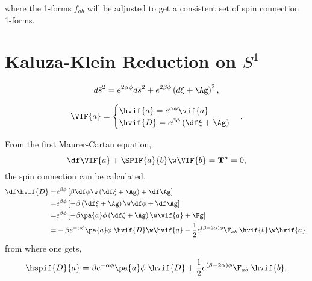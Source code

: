 where the 1-forms $f_{ab}$ will be adjusted to get a consistent set of spin connection 1-forms.






\chapter{Kaluza-Klein Reduction on $S^1$}


\begin{equation}
  d\hat{s}^2 = e^{2\alpha\phi}ds^2 + e^{2\beta\phi}\left(d\xi + \Ag\right)^2,
\end{equation}

\begin{equation}
\VIF{a} = 
\begin{cases}
  \hvif{a} = e^{\alpha\phi} \vif{a}\\
  \hvif{D} = e^{\beta\phi}\left(\df\xi +\Ag \right)
\end{cases},
\end{equation}

From the first Maurer-Cartan equation,
\begin{equation}
  \df\VIF{a} + \SPIF{a}{b}\w\VIF{b} = {\bf{T}}^{\hat{a}} = 0,
\end{equation}
the spin connection can be calculated.
\begin{align}
  \df\hvif{D} =& e^{\beta\phi}\left[\beta\df\phi\w\left(\df\xi +\Ag \right) + \df\Ag\right]\nonumber\\
  =& e^{\beta\phi}\left[-\beta\left(\df\xi +\Ag \right)\w\df\phi + \df\Ag\right]\nonumber\\
  =& e^{\beta\phi}\left[-\beta\pa{a}\phi\left(\df\xi +\Ag \right)\w\vif{a} + \Fg\right]\nonumber\\
 =& -\beta e^{-\alpha\phi}\pa{a}\phi\;\hvif{D}\w\hvif{a} -\frac{1}{2}e^{(\beta-2\alpha)\phi}\F_{a b}\;\hvif{b}\w\hvif{a},
\end{align}
from where one gets,
\begin{align}
  \hspif{D}{a} = \beta e^{-\alpha\phi}\pa{a}\phi\;\hvif{D} + \frac{1}{2}e^{(\beta-2\alpha)\phi}\F_{a b}\;\hvif{b}.
\end{align}


